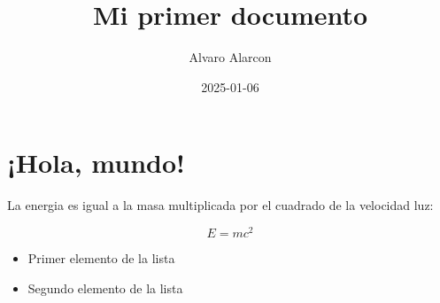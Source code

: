 \documentclass[a4paper,12pt]{article}
\title{Mi primer documento}
\date{2025-01-06}
\author{Alvaro Alarcon}
\begin{document}

\maketitle
\section{¡Hola, mundo!}
La energia es igual a la masa multiplicada por el cuadrado de la velocidad luz:


$$E = mc^2$$

\begin{itemize}
\item Primer elemento de la lista
\item Segundo elemento de la lista 
\end{itemize}
\end{document}
